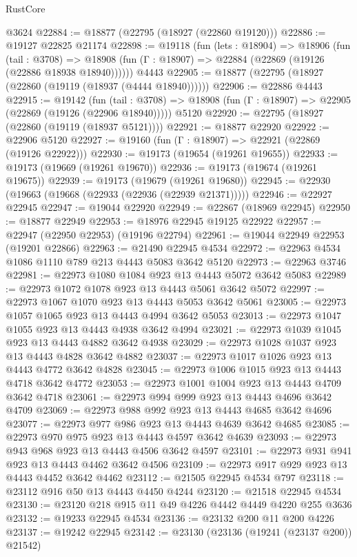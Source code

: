 \begin{lexlean}{RustCore}
\begin{coremodule}
    @3624
@22884 := @18877 (@22795 (@18927 (@22860 @19120)))
@22886 := @19127 @22825 @21174
@22898 := @19118
    (fun (lets : @18904) =>
    @18906
      (fun (tail : @3708) =>
      @18908 (fun (Γ : @18907) => @22884 (@22869 (@19126 (@22886 @18938 @18940))))))
    @4443
@22905 := @18877 (@22795 (@18927 (@22860 (@19119 (@18937 (@4444 @18940))))))
@22906 := @22886 @4443
@22915 := @19142
    (fun (tail : @3708) => @18908 (fun (Γ : @18907) => @22905 (@22869 (@19126 (@22906 @18940)))))
    @5120
@22920 := @22795 (@18927 (@22860 (@19119 (@18937 @5121))))
@22921 := @18877 @22920
@22922 := @22906 @5120
@22927 := @19160 (fun (Γ : @18907) => @22921 (@22869 (@19126 @22922)))
@22930 := @19173 (@19654 (@19261 @19655))
@22933 := @19173 (@19669 (@19261 @19670))
@22936 := @19173 (@19674 (@19261 @19675))
@22939 := @19173 (@19679 (@19261 @19680))
@22945 := @22930 (@19663 (@19668 (@22933 (@22936 (@22939 @21371)))))
@22946 := @22927 @22945
@22947 := @19044 @22920
@22949 := @22867 (@18969 @22945)
@22950 := @18877 @22949
@22953 := @18976 @22945 @19125 @22922
@22957 := @22947 (@22950 @22953) (@19196 @22794)
@22961 := @19044 @22949 @22953 (@19201 @22866)
@22963 := @21490 @22945 @4534
@22972 := @22963 @4534 @1086 @1110 @789 @213 @4443 @5083 @3642 @5120
@22973 := @22963 @3746
@22981 := @22973 @1080 @1084 @923 @13 @4443 @5072 @3642 @5083
@22989 := @22973 @1072 @1078 @923 @13 @4443 @5061 @3642 @5072
@22997 := @22973 @1067 @1070 @923 @13 @4443 @5053 @3642 @5061
@23005 := @22973 @1057 @1065 @923 @13 @4443 @4994 @3642 @5053
@23013 := @22973 @1047 @1055 @923 @13 @4443 @4938 @3642 @4994
@23021 := @22973 @1039 @1045 @923 @13 @4443 @4882 @3642 @4938
@23029 := @22973 @1028 @1037 @923 @13 @4443 @4828 @3642 @4882
@23037 := @22973 @1017 @1026 @923 @13 @4443 @4772 @3642 @4828
@23045 := @22973 @1006 @1015 @923 @13 @4443 @4718 @3642 @4772
@23053 := @22973 @1001 @1004 @923 @13 @4443 @4709 @3642 @4718
@23061 := @22973 @994 @999 @923 @13 @4443 @4696 @3642 @4709
@23069 := @22973 @988 @992 @923 @13 @4443 @4685 @3642 @4696
@23077 := @22973 @977 @986 @923 @13 @4443 @4639 @3642 @4685
@23085 := @22973 @970 @975 @923 @13 @4443 @4597 @3642 @4639
@23093 := @22973 @943 @968 @923 @13 @4443 @4506 @3642 @4597
@23101 := @22973 @931 @941 @923 @13 @4443 @4462 @3642 @4506
@23109 := @22973 @917 @929 @923 @13 @4443 @4452 @3642 @4462
@23112 := @21505 @22945 @4534 @797
@23118 := @23112 @916 @50 @13 @4443 @4450 @4244
@23120 := @21518 @22945 @4534
@23130 := @23120 @218 @915 @11 @49 @4226 @4442 @4449 @4220 @255 @3636
@23132 := @19233 @22945 @4534
@23136 := @23132 @200 @11 @200 @4226
@23137 := @19242 @22945
@23142 := @23130 (@23136 (@19241 (@23137 @200)) @21542)

\end{coremodule}
\end{lexlean}
